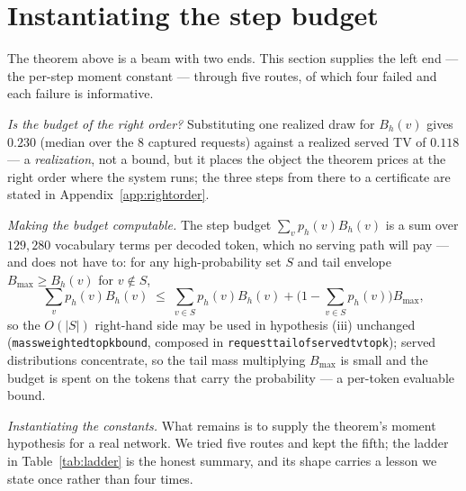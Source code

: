 \documentclass[11pt]{article}
\renewcommand{\_}{\WCorigunderscore\allowbreak}
\begin{document}
\section{Instantiating the step budget}
\label{sec:instantiate}
The theorem above is a beam with two ends. This section supplies the
left end --- the per-step moment constant --- through five routes, of
which four failed and each failure is informative.

\emph{Is the budget of the right order?} Substituting one realized
draw for $B_h(v)$ gives $0.230$ (median over the $8$ captured requests)
against a realized served TV of $0.118$ --- a \emph{realization}, not a
bound, but it places the object the theorem prices at the right order
where the system runs; the three steps from there to a certificate are
stated in Appendix~\ref{app:rightorder}.

\emph{Making the budget computable.} The step budget
$\sum_v p_h(v)B_h(v)$ is a sum over $129{,}280$ vocabulary terms per
decoded token, which no serving path will pay --- and does not have to:
for any high-probability set $S$ and tail envelope $B_{\max}\ge B_h(v)$
for $v\notin S$,
\begin{equation}\label{eq:topk}
  \sum_v p_h(v)B_h(v)\;\le\;\sum_{v\in S}p_h(v)B_h(v)
    +\Big(1-\sum_{v\in S}p_h(v)\Big)B_{\max},
\end{equation}
so the $O(|S|)$ right-hand side may be used in hypothesis (iii)
unchanged (\texttt{massweighted\_topk\_bound}, composed in
\texttt{request\_tail\_of\_served\_tv\_topk}); served distributions
concentrate, so the tail mass multiplying $B_{\max}$ is small and the
budget is spent on the tokens that carry the probability --- a per-token
evaluable bound.

\emph{Instantiating the constants.} What remains is to supply the
theorem's moment hypothesis for a real network. We tried five routes and
kept the fifth; the ladder in Table~\ref{tab:ladder} is the honest
summary, and its shape carries a lesson we state once rather than four
times.
\end{document}
